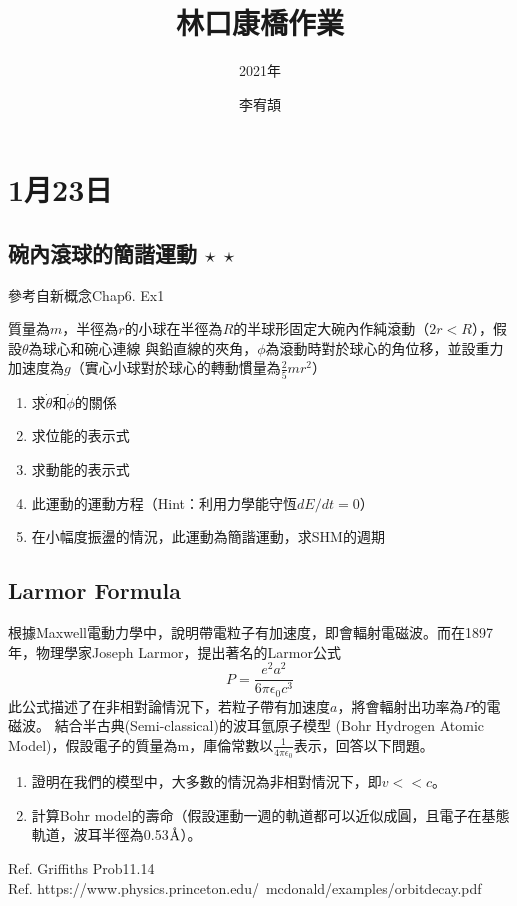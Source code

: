 \documentclass[cn,10pt,math=newtx,chinesefont=founder]{elegantbook}
\title{林口康橋作業}
\subtitle{2021年}
\author{李宥頡}
\institute{National Taiwan University}
\begin{document}
\maketitle
\frontmatter


\tableofcontents

\mainmatter


\chapter{1月23日}
\section{碗內滾球的簡諧運動 $\star\ \star$}
參考自新概念Chap6. Ex1
\begin{example}
    質量為$m$，半徑為$r$的小球在半徑為$R$的半球形固定大碗內作純滾動（$2r<R$），假設$\theta$為球心和碗心連線
    與鉛直線的夾角，$\phi$為滾動時對於球心的角位移，並設重力加速度為$g$（實心小球對於球心的轉動慣量為$\frac{2}{5}mr^2$）
    \begin{enumerate}
        \item 求$\dot{\theta}$和$\dot{\phi}$的關係 
        \item 求位能的表示式
        \item 求動能的表示式
        \item 此運動的運動方程（Hint：利用力學能守恆$dE/dt=0$）
        \item 在小幅度振盪的情況，此運動為簡諧運動，求SHM的週期
    \end{enumerate}
\end{example}
\newpage

\section{Larmor Formula}
\begin{example}
    根據Maxwell電動力學中，說明帶電粒子有加速度，即會輻射電磁波。而在1897年，物理學家Joseph Larmor，提出著名的Larmor公式
    \begin{equation}
        P = \frac{e^2 a^2}{6\pi \epsilon_{0} c^3}
    \end{equation}
    此公式描述了在非相對論情況下，若粒子帶有加速度$a$，將會輻射出功率為$P$的電磁波。
    結合半古典(Semi-classical)的波耳氫原子模型
    (Bohr Hydrogen Atomic Model)，假設電子的質量為m，庫倫常數以$\frac{1}{4\pi\epsilon_0}$表示，回答以下問題。
    \begin{enumerate}
        \item 證明在我們的模型中，大多數的情況為非相對情況下，即$v<<c$。
        \item 計算Bohr model的壽命（假設運動一週的軌道都可以近似成圓，且電子在基態軌道，波耳半徑為0.53$\mbox{\normalfont\AA}$）。
    \end{enumerate}
    Ref. Griffiths Prob11.14 \\
    Ref. https://www.physics.princeton.edu/~mcdonald/examples/orbitdecay.pdf
\end{example}
\end{document}
